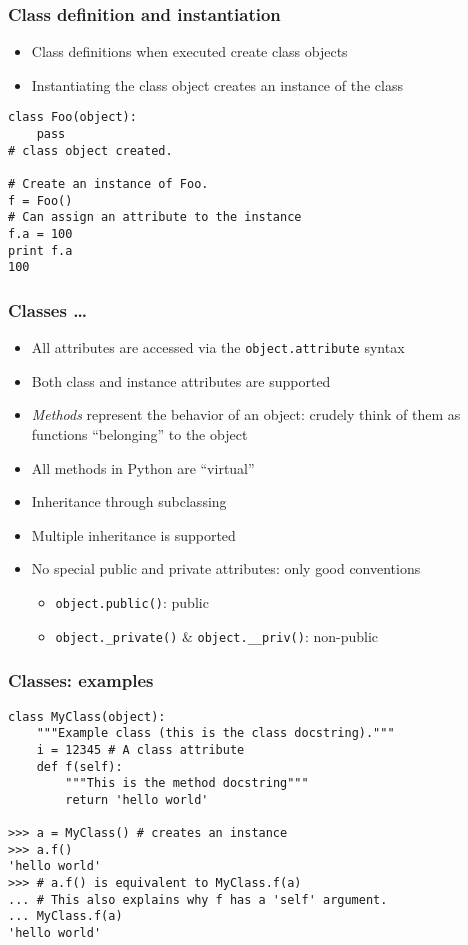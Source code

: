 \begin{frame}[fragile]
  \frametitle{Class definition and instantiation}
  \begin{itemize}
  \item Class definitions when executed create class objects
  \item Instantiating the class object creates an instance of the
    class
  \end{itemize}
\footnotesize
\begin{lstlisting}
class Foo(object):
    pass
# class object created.

# Create an instance of Foo.
f = Foo()
# Can assign an attribute to the instance
f.a = 100
print f.a
100
\end{lstlisting}
\end{frame}

\begin{frame}[fragile]
  \frametitle{Classes \ldots}
  \begin{itemize}
  \item All attributes are accessed via the \texttt{object.attribute}
    syntax
  \item Both class and instance attributes are supported
  \item \emph{Methods} represent the behavior of an object: crudely
    think of them as functions ``belonging'' to the object
  \item All methods in Python are ``virtual''
  \item Inheritance through subclassing
  \item Multiple inheritance is supported
  \item No special public and private attributes: only good
    conventions
    \begin{itemize}
    \item \verb+object.public()+: public
    \item \verb+object._private()+ \& \verb+object.__priv()+: 
      non-public
    \end{itemize}
  \end{itemize}
\end{frame}

\begin{frame}[fragile]
  \frametitle{Classes: examples}
\begin{lstlisting}
class MyClass(object):
    """Example class (this is the class docstring)."""
    i = 12345 # A class attribute
    def f(self):
        """This is the method docstring"""
        return 'hello world'

>>> a = MyClass() # creates an instance
>>> a.f()
'hello world'
>>> # a.f() is equivalent to MyClass.f(a)
... # This also explains why f has a 'self' argument.
... MyClass.f(a)
'hello world'
\end{lstlisting}
\end{frame}

